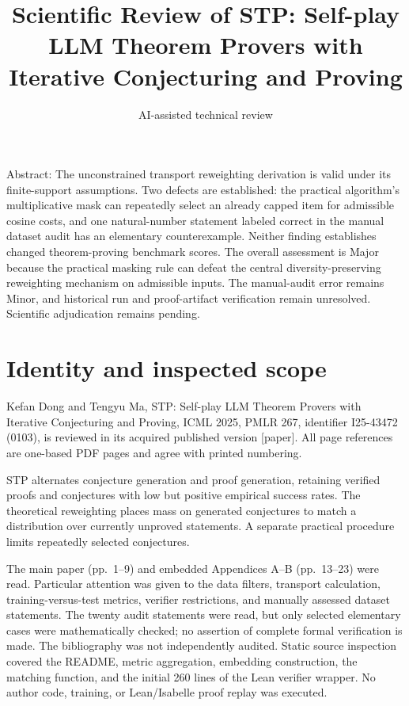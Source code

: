 \documentclass[10pt]{article}
\title{Scientific Review of
STP: Self-play LLM Theorem Provers with Iterative Conjecturing and Proving}
\author{AI-assisted technical review}
\date{}
\begin{document}
\maketitle
Abstract: The unconstrained transport reweighting derivation is valid under its finite-support assumptions. Two defects are established: the practical algorithm’s multiplicative mask can repeatedly select an already capped item for admissible cosine costs, and one natural-number statement labeled correct in the manual dataset audit has an elementary counterexample. Neither finding establishes changed theorem-proving benchmark scores. The overall assessment is Major because the practical masking rule can defeat the central diversity-preserving reweighting mechanism on admissible inputs. The manual-audit error remains Minor, and historical run and proof-artifact verification remain unresolved. Scientific adjudication remains pending.\par
\section*{Identity and inspected scope}
Kefan Dong and Tengyu Ma, STP: Self-play LLM Theorem Provers with Iterative Conjecturing and Proving, ICML 2025, PMLR 267, identifier I25-43472 (0103), is reviewed in its acquired published version [paper]. All page references are one-based PDF pages and agree with printed numbering.\par
STP alternates conjecture generation and proof generation, retaining verified proofs and conjectures with low but positive empirical success rates. The theoretical reweighting places mass on generated conjectures to match a distribution over currently unproved statements. A separate practical procedure limits repeatedly selected conjectures.\par
The main paper (pp. 1–9) and embedded Appendices A–B (pp. 13–23) were read. Particular attention was given to the data filters, transport calculation, training-versus-test metrics, verifier restrictions, and manually assessed dataset statements. The twenty audit statements were read, but only selected elementary cases were mathematically checked; no assertion of complete formal verification is made. The bibliography was not independently audited. Static source inspection covered the README, metric aggregation, embedding construction, the matching function, and the initial 260 lines of the Lean verifier wrapper. No author code, training, or Lean/Isabelle proof replay was executed.\par
\end{document}
